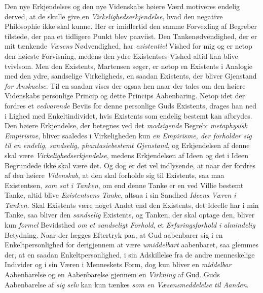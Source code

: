 \documentclass[12pt,a4paper]{book}
\newcommand{\opage}[1]{\marginnote{\footnotesize\textit{[#1]}}}
\begin{document}
\opage{108}Den nye Erkjendelses og den nye Videnskabs høiere Værd motiveres endelig derved, at de
skulle give en \emph{Virkelighedserkjendelse}, hvad den negative Philosophie ikke skal
kunne. Her er imidlertid den samme Forvexling af Begreber tilstede, der paa et tidligere
Punkt blev paaviist. Den Tankenødvendighed, der er mit tænkende \emph{Væsens} Nødvendighed, har
\emph{existentiel} Vished for mig og er netop den høieste Forvisning, medens den ydre
Existentses Vished altid kan blive tvivlsom. Men den Existents, Martensen søger, er netop
en Existents i Analogie med den ydre, sandselige Virkeligheds, en saadan Existents, der
bliver Gjenstand \emph{for Anskuelse}. Til en saadan vises der ogsaa hen naar der tales om den
høiere Videnskabs personlige Princip og dette Princips Aabenbaring. Netop idet der fordres
et \emph{vedvarende} Beviis for denne personlige Guds Existents, drages han ned i Lighed med
Enkeltindividet, hvis Existents som endelig bestemt kan afbrydes. Den høiere Erkjendelse,
der betegnes ved det \emph{modsigende} Begreb: \emph{metaphysisk Empirisme}, bliver saaledes i
Virkeligheden kun \emph{en Empirisme, der forholder sig til en endelig, sandselig,
phantasiebestemt Gjenstand}, og Erkjendelsen af denne skal være \emph{Virkelighedserkjendelse},
medens Erkjendelsen af Ideen og det i Ideen Begrundede ikke skal være det. Og dog er det
vel indlysende, at naar der fordres af den høiere \emph{Videnskab}, at den skal forholde sig til
Existents, saa maa Existentsen, \emph{som sat i Tanken}, om end denne Tanke er en ved Villie
bestemt Tanke, altid blive \emph{Existentsens Tanke}, altsaa i sin Sandhed \emph{Ideens Væren i Tanken}. Skal Existents være noget Andet end den Existents, det Ideelle har i min Tanke,
saa bliver den \emph{sandselig} Existents, og Tanken, der skal optage den, bliver kun
\emph{formel} Bevidsthed \emph{om et sandseligt Forhold}, et \emph{Erfaringsforhold i almindelig} Betydning. Naar der lægges Eftertryk paa, at Gud aabenbarer sig i en Enkeltpersonlighed
for derigjennem at være \emph{umiddelbart} aabenbaret, saa glemmes der, at en saadan
Enkeltpersonlighed, i sin Adskillelse fra de andre menne\opage{109}skelige Individer og i sin Væren i
Menneskets Form, dog kun bliver en \emph{middelbar} Aabenbarelse og en Aabenbarelse
gjennem en \emph{Virkning} af Gud. Guds Aabenbarelse af \emph{sig selv} kan kun tænkes \emph{som en Væsensmeddelelse til Aanden}.
\end{document}
